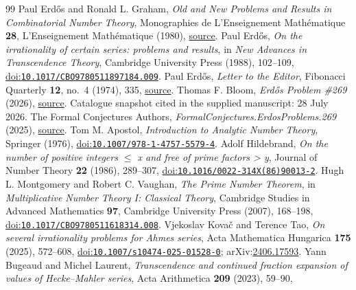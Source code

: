 \begin{thebibliography}{99}
 Paul Erd\H{o}s and Ronald L. Graham,
  \emph{Old and New Problems and Results in Combinatorial Number Theory}, Monographies de L'Enseignement Math\'{e}matique \textbf{28}, L'Enseignement Math\'{e}matique (1980),
  \href{https://mathweb.ucsd.edu/~ronspubs/80_11_number_theory.pdf}{source}.
 Paul Erd\H{o}s,
  \emph{On the irrationality of certain series: problems and results}, in \emph{New Advances in Transcendence Theory}, Cambridge University Press (1988), 102--109,
  \href{https://doi.org/10.1017/CBO9780511897184.009}{doi:\nolinkurl{10.1017/CBO9780511897184.009}}.
 Paul Erd\H{o}s,
  \emph{Letter to the Editor}, Fibonacci Quarterly \textbf{12}, no.~4 (1974), 335,
  \href{https://www.fq.math.ca/Scanned/12-4/letter.pdf}{source}.
 Thomas F. Bloom,
  \emph{Erd\H{o}s Problem \#269} (2026),
  \href{https://www.erdosproblems.com/269}{source}. Catalogue snapshot cited in the supplied manuscript: 28 July 2026.
 The Formal Conjectures Authors,
  \emph{FormalConjectures.ErdosProblems.269} (2025),
  \href{https://github.com/google-deepmind/formal-conjectures/blob/f776d2f2039351b00737ffcafb9d7d7666e1d9af/FormalConjectures/ErdosProblems/269.lean}{source}.
 Tom M. Apostol,
  \emph{Introduction to Analytic Number Theory}, Springer (1976),
  \href{https://doi.org/10.1007/978-1-4757-5579-4}{doi:\nolinkurl{10.1007/978-1-4757-5579-4}}.
 Adolf Hildebrand,
  \emph{On the number of positive integers $\le$ x and free of prime factors > y}, Journal of Number Theory \textbf{22} (1986), 289--307,
  \href{https://doi.org/10.1016/0022-314X(86)90013-2}{doi:\nolinkurl{10.1016/0022-314X(86)90013-2}}.
 Hugh L. Montgomery and Robert C. Vaughan,
  \emph{The Prime Number Theorem}, in \emph{Multiplicative Number Theory I: Classical Theory}, Cambridge Studies in Advanced Mathematics \textbf{97}, Cambridge University Press (2007), 168--198,
  \href{https://doi.org/10.1017/CBO9780511618314.008}{doi:\nolinkurl{10.1017/CBO9780511618314.008}}.
 Vjekoslav Kova\v{c} and Terence Tao,
  \emph{On several irrationality problems for Ahmes series}, Acta Mathematica Hungarica \textbf{175} (2025), 572--608,
  \href{https://doi.org/10.1007/s10474-025-01528-0}{doi:\nolinkurl{10.1007/s10474-025-01528-0}}; arXiv:\href{https://arxiv.org/abs/2406.17593}{2406.17593}.
 Yann Bugeaud and Michel Laurent,
  \emph{Transcendence and continued fraction expansion of values of Hecke--Mahler series}, Acta Arithmetica \textbf{209} (2023), 59--90,

\end{thebibliography}
